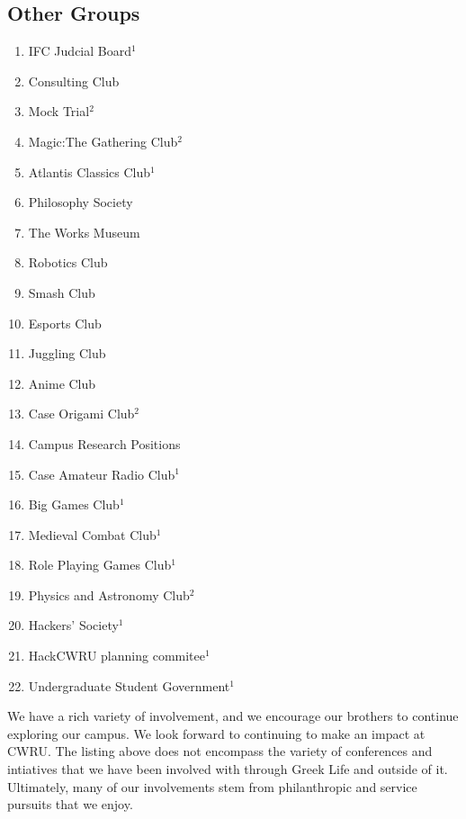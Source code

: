     \subsection*{Other Groups}
      \begin{enumerate}
    	\item IFC Judcial Board$^1$
    	\item Consulting Club
		\item Mock Trial$^2$
		\item Magic:The Gathering Club$^2$
		\item Atlantis Classics Club$^1$
		\item Philosophy Society
		\item The Works Museum
		\item Robotics Club
		\item Smash Club
		\item Esports Club
		\item Juggling Club
		\item Anime Club
		\item Case Origami Club$^2$
		\item Campus Research Positions
		\item Case Amateur Radio Club$^1$
		\item Big Games Club$^1$
		\item Medieval Combat Club$^1$
		\item Role Playing Games Club$^1$
		\item Physics and Astronomy Club$^2$
		\item Hackers' Society$^1$
		\item HackCWRU planning commitee$^1$
		\item Undergraduate Student Government$^1$
      \end{enumerate}

  We have a rich variety of involvement, and we encourage our brothers to continue exploring our campus. We look forward to continuing to make an impact at CWRU. The listing above does not encompass the variety of conferences and intiatives that we have been involved with through Greek Life and outside of it. Ultimately, many of our involvements stem from philanthropic and service pursuits that we enjoy.
